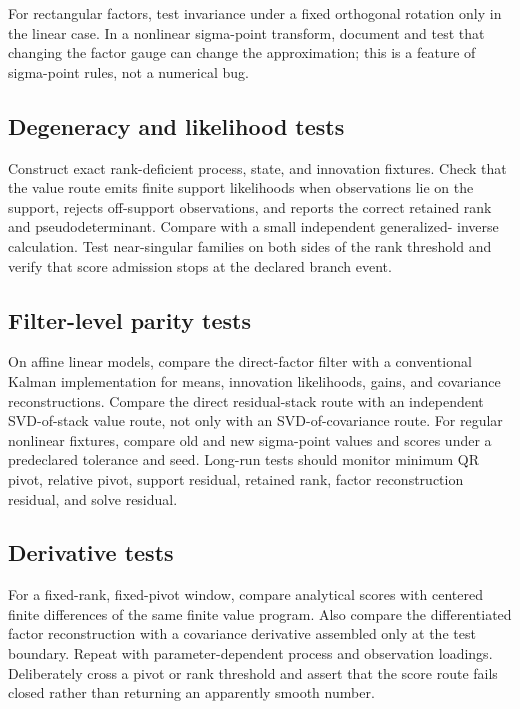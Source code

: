 \documentclass[11pt]{article}
\begin{document}
For rectangular factors, test invariance under a fixed orthogonal rotation only
in the linear case.  In a nonlinear sigma-point transform, document and test
that changing the factor gauge can change the approximation; this is a feature
of sigma-point rules, not a numerical bug.

\subsection{Degeneracy and likelihood tests}

Construct exact rank-deficient process, state, and innovation fixtures.  Check
that the value route emits finite support likelihoods when observations lie on
the support, rejects off-support observations, and reports the correct retained
rank and pseudodeterminant.  Compare with a small independent generalized-
inverse calculation.  Test near-singular families on both sides of the rank
threshold and verify that score admission stops at the declared branch event.

\subsection{Filter-level parity tests}

On affine linear models, compare the direct-factor filter with a conventional
Kalman implementation for means, innovation likelihoods, gains, and covariance
reconstructions.  Compare the direct residual-stack route with an independent
SVD-of-stack value route, not only with an SVD-of-covariance route.  For regular
nonlinear fixtures, compare old and new sigma-point values and scores under a
predeclared tolerance and seed.  Long-run tests should monitor minimum QR pivot,
relative pivot, support residual, retained rank, factor reconstruction residual,
and solve residual.

\subsection{Derivative tests}

For a fixed-rank, fixed-pivot window, compare analytical scores with centered
finite differences of the same finite value program.  Also compare the
differentiated factor reconstruction with a covariance derivative assembled
only at the test boundary.  Repeat with parameter-dependent process and
observation loadings.  Deliberately cross a pivot or rank threshold and assert
that the score route fails closed rather than returning an apparently smooth
number.
\end{document}
